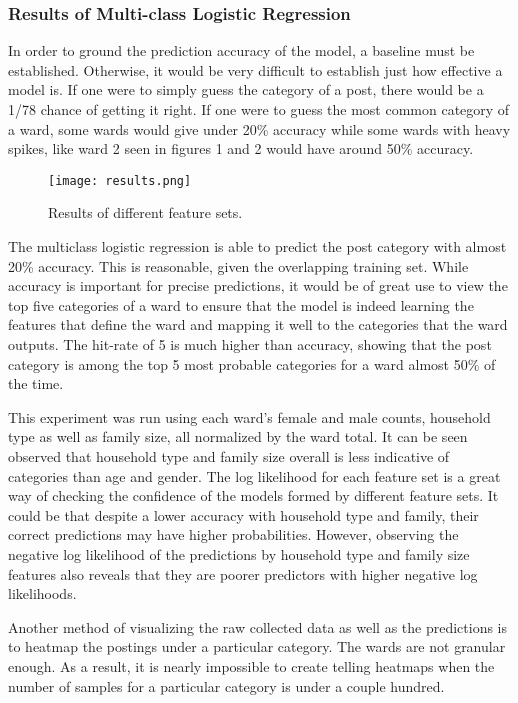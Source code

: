 \documentclass[12pt]{article}
\begin{document}
\subsubsection{Results of Multi-class Logistic Regression}

In order to ground the prediction accuracy of the model, a baseline must be established. Otherwise, it would be very difficult to establish just how effective a model is. 
If one were to simply guess the category of a post, there would be a 1/78 chance of getting it right. If one were to guess the most common category of a ward, some wards would give under 20\% accuracy while some wards with heavy spikes, like ward 2 seen in figures 1 and 2 would have around 50\% accuracy. 

\begin{figure}[h]
\centering
\texttt{[image: results.png]}
\caption{Results of different feature sets.}
\end{figure}
The multiclass logistic regression is able to predict the post category with almost 20\% accuracy. This is reasonable, given the overlapping training set. 
While accuracy is important for precise predictions, it would be of great use to view the top five categories of a ward to ensure that the model is indeed learning the features that define the ward and mapping it well to the categories that the ward outputs. The hit-rate of 5 is much higher than accuracy, showing that the post category is among the top 5 most probable categories for a ward almost 50\% of the time. 

This experiment was run using each ward's female and male counts, household type as well as family size, all normalized by the ward total. 
It can be seen observed that household type and family size overall is less indicative of categories than age and gender. The log likelihood for each feature set is a great way of checking the confidence of the models formed by different feature sets. It could be that despite a lower accuracy with household type and family, their correct predictions may have higher probabilities. However, observing the negative log likelihood of the predictions by household type and family size features also reveals that they are poorer predictors with higher negative log likelihoods.

Another method of visualizing the raw collected data as well as the predictions is to heatmap the postings under a particular category.   
The wards are not granular enough. As a result, it is nearly impossible to create telling heatmaps when the number of samples for a particular category is under a couple hundred. 
\end{document}
